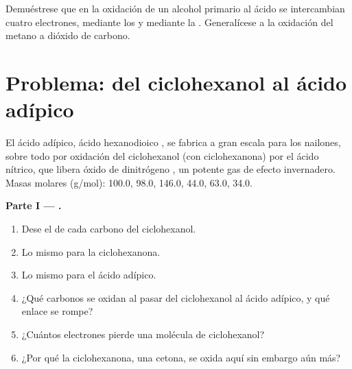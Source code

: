 \begin{exercise}[$\star\star\star$]\label{exo:b1:organic-redox:12}
Demuéstrese que en la oxidación de un alcohol primario al ácido se
intercambian cuatro electrones, mediante los  y
mediante la . Generalícese a la oxidación del metano a
dióxido de carbono.
\end{exercise}

\section{Problema: del ciclohexanol al ácido adípico}

\begin{problem}
\label{pb:b1:organic-redox:1}
El ácido adípico, ácido hexanodioico , se fabrica a
gran escala para los nailones, sobre todo por oxidación del ciclohexanol
(con ciclohexanona) por el ácido nítrico, que libera óxido de dinitrógeno
, un potente gas de efecto invernadero. Masas molares
(\unit{g/mol}):  100.0,
 98.0,  146.0,  44.0,  63.0,
 34.0.

\medskip
\noindent\textbf{Parte I --- .}
\begin{enumerate}
  \item Dese el  de cada carbono del ciclohexanol.
  \item Lo mismo para la ciclohexanona.
  \item Lo mismo para el ácido adípico.
  \item ¿Qué carbonos se oxidan al pasar del ciclohexanol al ácido
        adípico, y qué enlace se rompe?
  \item ¿Cuántos electrones pierde una molécula de ciclohexanol?
  \item ¿Por qué la ciclohexanona, una cetona, se oxida aquí sin embargo
        aún más?
\end{enumerate}


\end{problem}
